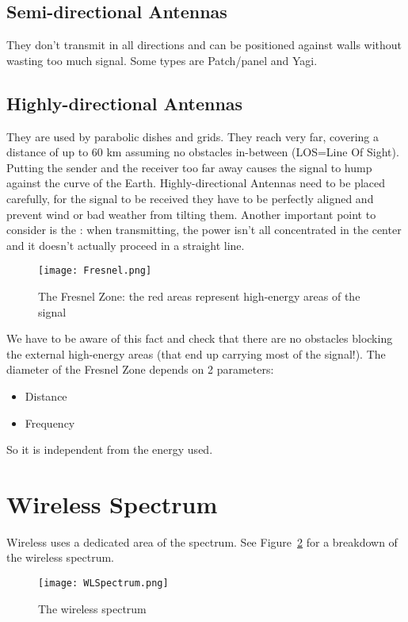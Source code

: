 \subsection{Semi-directional Antennas} They don't transmit in all 
directions and can be positioned against walls without wasting too much signal. 
Some types are Patch/panel and Yagi.

\subsection{Highly-directional Antennas} They are used by parabolic 
dishes and grids. They reach very far, covering a distance of up to 60 km 
assuming no obstacles in-between (LOS=Line Of Sight). Putting the sender and the 
receiver too far away causes the signal to hump against the curve of the Earth. 
Highly-directional Antennas need to be placed carefully, for the signal to be 
received they have to be perfectly aligned and prevent wind or bad weather from 
tilting them.
Another important point to consider is the :
when transmitting, the power isn't all concentrated in the center and it doesn't
actually proceed in a straight line.

\begin{figure}[h]
  \centering
  \texttt{[image: Fresnel.png]}
  \caption[The Fresnel Zone]{The Fresnel Zone: the red areas represent
    high-energy areas of the signal}				
  \label{fig:ewn:Fresnel}
\end{figure}

We have to be aware of this fact and check that there are no obstacles 
blocking the external high-energy areas (that end up carrying most of the 
signal!).
The diameter of the Fresnel Zone depends on 2 parameters:
\begin{itemize}
\item Distance
\item Frequency
\end{itemize}
So it is independent from the energy used.

\section{Wireless Spectrum}
Wireless uses a dedicated area of the spectrum. See
Figure~\ref{fig:ewn:WLSpectrum} for a breakdown of the wireless spectrum.

\begin{figure}[h]
  \centering
  \texttt{[image: WLSpectrum.png]}
  \caption{The wireless spectrum}				
  \label{fig:ewn:WLSpectrum}
\end{figure}	

